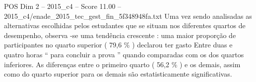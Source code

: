 \begin{textsample}{POS Dim 2 – 2015\_c4 – Score 11.00 – 2015\_c4/enade\_2015\_tec\_gest\_fin\_5f348948fa.txt}
Uma vez sendo analisadas as alternativas escolhidas pelos estudantes que se situam nos diferentes quartos de desempenho, observa -se uma tendência crescente : uma maior proporção de participantes no quarto superior ( 79,6 \% ) declarou ter gasto Entre duas e quatro horas “ para concluir a prova ” quando comparadas com os dos quartos inferiores.
As diferenças entre o primeiro quarto ( 56,2 \% ) e os demais, assim como do quarto superior para os demais são estatisticamente significativas.

\end{textsample}

